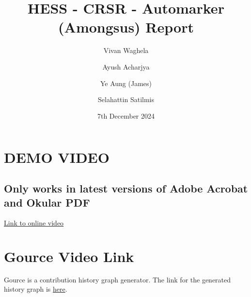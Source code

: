 \documentclass[a4paper, 12pt]{article}
\begin{document}
\title{HESS - CRSR - Automarker (Amongsus) Report}
\author{Vivan Waghela \and Ayush Acharjya \and Ye Aung (James) \and Selahattin Satilmis}
\date{7th December 2024}
\maketitle

\section*{DEMO VIDEO}
\subsection*{Only works in latest versions of Adobe Acrobat and Okular PDF}
\noindent\href{https://bham-my.sharepoint.com/personal/axa2204_student_bham_ac_uk/_layouts/15/guestaccess.aspx?share=ETttWhWBaN5Cg4imyyt9B0sBOtxlj_SgOvyaVzMR3Kuz4g&nav=eyJyZWZlcnJhbEluZm8iOnsicmVmZXJyYWxBcHAiOiJPbmVEcml2ZUZvckJ1c2luZXNzIiwicmVmZXJyYWxBcHBQbGF0Zm9ybSI6IldlYiIsInJlZmVycmFsTW9kZSI6InZpZXciLCJyZWZlcnJhbFZpZXciOiJNeUZpbGVzTGlua0NvcHkifX0&e=0tRqZy}{Link to online video}

\vspace{3mm}

\noindent{}

\section*{Gource Video Link}
Gource is a contribution history graph generator. The link for the generated history graph is \href{https://bham-my.sharepoint.com/personal/vxw397_student_bham_ac_uk/_layouts/15/guestaccess.aspx?share=EfxBPncvaS9Ikv4icBteGqkBTj_La-L_GhuZvfUcs9hWzA&nav=eyJyZWZlcnJhbEluZm8iOnsicmVmZXJyYWxBcHAiOiJPbmVEcml2ZUZvckJ1c2luZXNzIiwicmVmZXJyYWxBcHBQbGF0Zm9ybSI6IldlYiIsInJlZmVycmFsTW9kZSI6InZpZXciLCJyZWZlcnJhbFZpZXciOiJNeUZpbGVzTGlua0NvcHkifX0&e=ppezH1}{here}.
\end{document}
